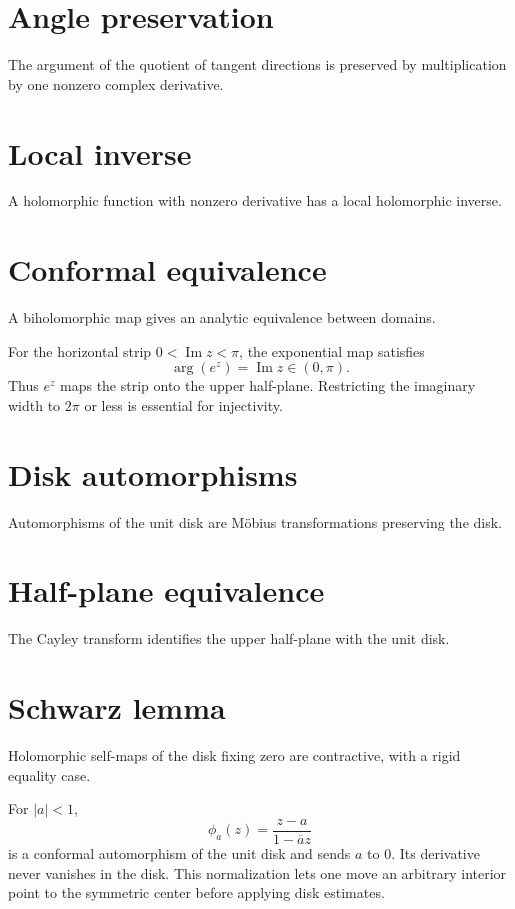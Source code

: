 \section{Angle preservation}
The argument of the quotient of tangent directions is preserved by multiplication by one nonzero complex derivative.

\section{Local inverse}
A holomorphic function with nonzero derivative has a local holomorphic inverse.

\section{Conformal equivalence}
A biholomorphic map gives an analytic equivalence between domains.

\begin{example}\label{ex:iv17-expand-02}
For the horizontal strip \(0<\operatorname{Im}z<\pi\), the exponential map satisfies
\[
\arg(e^z)=\operatorname{Im}z\in(0,\pi).
\]
Thus \(e^z\) maps the strip onto the upper half-plane. Restricting the imaginary width to \(2\pi\) or less is essential for injectivity.
\end{example}
\section{Disk automorphisms}
Automorphisms of the unit disk are Möbius transformations preserving the disk.

\section{Half-plane equivalence}
The Cayley transform identifies the upper half-plane with the unit disk.

\section{Schwarz lemma}
Holomorphic self-maps of the disk fixing zero are contractive, with a rigid equality case.

\begin{example}\label{ex:iv17-expand-03}
For \(|a|<1\),
\[
\phi_a(z)=\frac{z-a}{1-\overline a z}
\]
is a conformal automorphism of the unit disk and sends \(a\) to \(0\). Its derivative never vanishes in the disk. This normalization lets one move an arbitrary interior point to the symmetric center before applying disk estimates.
\end{example}
